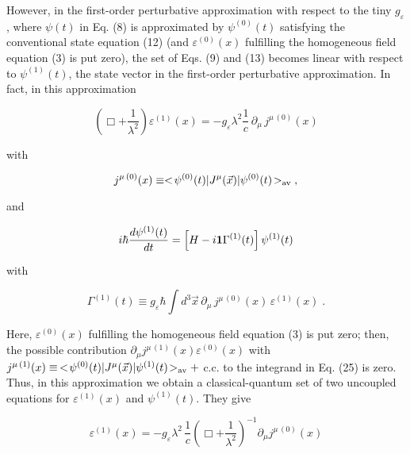 \documentclass[a4paper,12pt]{article}
\begin{document}
However, in the first-order perturbative approximation with respect to the tiny $g_\varepsilon $, where $\psi(t)$ in Eq. (8) is approximated by $\psi^{(0)}(t)$ satisfying the conventional state equation (12) (and $\varepsilon^{(0)}(x)$ fulfilling the homogeneous field equation (3) is put zero), the set of Eqs. (9) and (13) becomes linear with respect to $\psi^{(1)}(t)$, the state vector in the first-order perturbative approximation. In fact, in this approximation

\begin{equation}
\left( \Box + \frac{1}{\lambda^2}\right) \varepsilon^{(1)} (x) = -g_\varepsilon \lambda ^2 \frac{1}{c} \,\partial_\mu\, j^{\mu\,(0)}(x) 
\end{equation}

\ni with

\begin{equation}
j^{\mu\,(0)}(x) \equiv <\!\psi^{(0)}(t)|J^\mu (\vec{x})|\psi^{(0)}(t)\!>_{\rm av}\;,
\end{equation}

\ni and

\begin{equation}
i\hbar \frac{d\psi^{(1)}(t)}{dt} = \left[H - i{\bf 1} \Gamma^{(1)}(t) \right] \psi^{(1)}(t)
\end{equation}

\ni with

\begin{equation}
\Gamma^{(1)}(t) \equiv g_\varepsilon \hbar\int d^3\vec{x}\, \partial_\mu\, j^{\mu\,(0)}(x) \,\varepsilon^{(1)}(x)\;.
\end{equation}

\ni Here, $\varepsilon^{(0)}(x)$ fulfilling the homogeneous field equation (3) is put zero; then, the possible contribution $\partial_\mu j^{\mu\,(1)}(x) \varepsilon^{(0)}(x)$ with $j^{\mu\,(1)}(x) \equiv \,<\!\psi^{(0)}(t)| J^\mu(\vec{x})| \psi^{(1)}(t)\!>_{\rm av} +$ c.c. to the integrand in Eq. (25) is zero. Thus, in this approximation we obtain a classical-quantum set of two uncoupled equations for $\varepsilon^{(1)} (x)$ and $\psi^{(1)}(t)$. They give

\begin{equation}
\varepsilon^{(1)}(x) = -g_\varepsilon \lambda^2\,\frac{1}{c} \left( \Box + \frac{1}{\lambda^2}\right)^{-1} \partial_\mu j^{\mu\,(0)}(x)
\end{equation}

\vspace{-0.1cm}
\end{document}
